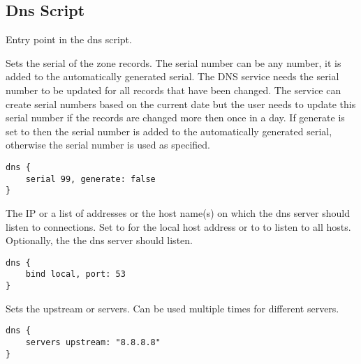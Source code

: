 \subsection{Dns Script}



Entry point in the dns script.


Sets the serial  of the zone records.
The serial number can be any number, it is added to the automatically
generated serial. The DNS service needs the serial number to be updated
for all records that have been changed. The service can create serial
numbers based on the current date but the user needs to update this
serial number if the records are changed more then once in a day.
If generate is set to  then the serial number is added to
the automatically generated serial, otherwise the serial number is used 
as specified.

\begin{lstlisting}[style=Java]
dns {
    serial 99, generate: false
}
\end{lstlisting}

\TheStatement*[dns!bind]{bind [local|all|\Arg{address} [, port: \Arg{port}]}

The IP  or a list of addresses or the host name(s) 
on which the dns server should listen to connections. Set to 
for the local host address  or to  to listen to all
hosts. Optionally, the  the dns server should listen.

\begin{lstlisting}[style=Java]
dns {
    bind local, port: 53
}
\end{lstlisting}


Sets the upstream  or servers. Can be used multiple times
for different servers.

\begin{lstlisting}[style=Java]
dns {
    servers upstream: "8.8.8.8"
}
\end{lstlisting}

